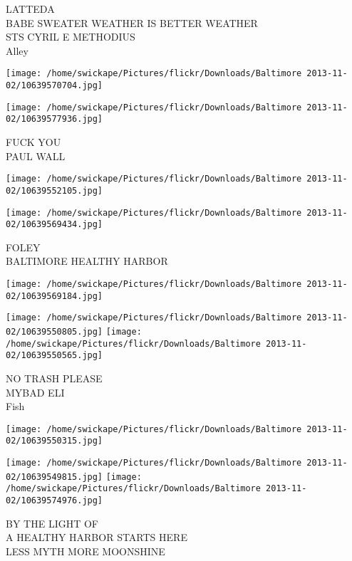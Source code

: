 \documentclass[10pt,letterpaper]{article}
\begin{document}
LATTEDA\\
BABE SWEATER WEATHER IS BETTER WEATHER\\
STS CYRIL E METHODIUS\\
Alley\\
\pagebreak

\texttt{[image: /home/swickape/Pictures/flickr/Downloads/Baltimore 2013-11-02/10639570704.jpg]}

\vspace{0.25in}
\texttt{[image: /home/swickape/Pictures/flickr/Downloads/Baltimore 2013-11-02/10639577936.jpg]}

FUCK YOU\\
PAUL WALL\\
\pagebreak

\texttt{[image: /home/swickape/Pictures/flickr/Downloads/Baltimore 2013-11-02/10639552105.jpg]}

\vspace{0.25in}
\texttt{[image: /home/swickape/Pictures/flickr/Downloads/Baltimore 2013-11-02/10639569434.jpg]}

FOLEY\\
BALTIMORE HEALTHY HARBOR\\
\pagebreak

\texttt{[image: /home/swickape/Pictures/flickr/Downloads/Baltimore 2013-11-02/10639569184.jpg]}

\vspace{0.25in}
\texttt{[image: /home/swickape/Pictures/flickr/Downloads/Baltimore 2013-11-02/10639550805.jpg]}
\texttt{[image: /home/swickape/Pictures/flickr/Downloads/Baltimore 2013-11-02/10639550565.jpg]}

NO TRASH PLEASE\\
MYBAD ELI\\
Fish\\
\pagebreak

\texttt{[image: /home/swickape/Pictures/flickr/Downloads/Baltimore 2013-11-02/10639550315.jpg]}

\vspace{0.25in}
\texttt{[image: /home/swickape/Pictures/flickr/Downloads/Baltimore 2013-11-02/10639549815.jpg]}
\texttt{[image: /home/swickape/Pictures/flickr/Downloads/Baltimore 2013-11-02/10639574976.jpg]}

BY THE LIGHT OF\\
A HEALTHY HARBOR STARTS HERE\\
LESS MYTH MORE MOONSHINE\\
\pagebreak
\end{document}
